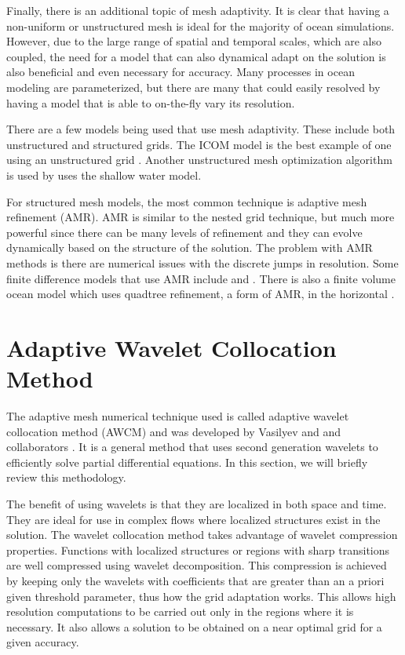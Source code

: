 Finally, there is an additional topic of mesh adaptivity.  It is clear that having a non-uniform or unstructured mesh is ideal for the majority of ocean simulations.  However, due to the large range of spatial and temporal scales, which are also coupled, the need for a model that can also dynamical adapt on the solution is also beneficial and even necessary for accuracy.  Many processes in ocean modeling are parameterized, but there are many that could easily resolved by having a model that is able to on-the-fly vary its resolution.  \cite{08PPGMK}

There are a few models being used that use mesh adaptivity.  These include both unstructured and structured grids.  The ICOM model is the best example of one using an unstructured grid \cite{05PPGPG, 08PGPACMW, 05PPGFGMEPO}.  Another unstructured mesh optimization algorithm is used by \cite{07BCLDR} uses the shallow water model.  

For structured mesh models, the most common technique is adaptive mesh refinement (AMR).  AMR is similar to the nested grid technique, but much more powerful since there can be many levels of refinement and they can evolve dynamically based on the structure of the solution.  The problem with AMR methods is there are numerical issues with the discrete jumps in resolution.  Some finite difference models that use AMR include \cite{99BD} and \cite{05DBB}.  There is also a finite volume ocean model which uses quadtree refinement, a form of AMR, in the horizontal \cite{07PR}.  


\section{Adaptive Wavelet Collocation Method}
\label{sec:wavelet}

The adaptive mesh numerical technique used is called adaptive wavelet collocation method (AWCM) and was developed by Vasilyev and and collaborators \cite{vasilyev:2003,vasilyev-bowman:2000}.  It is a general method that uses second generation wavelets to efficiently solve partial differential equations.  In this section, we will briefly review this methodology. 

The benefit of using wavelets is that they are localized in both space and time.  They are ideal for use in complex flows where localized structures exist in the solution.  The wavelet collocation method takes advantage of wavelet compression properties.  Functions with localized structures or regions with sharp transitions are well compressed using wavelet decomposition.  This compression is achieved by keeping only the wavelets with coefficients that are greater than an a priori given threshold parameter, thus how the grid adaptation works.  This allows high resolution computations to be carried out only in the regions where it is necessary.  It also allows a solution to be obtained on a near optimal grid for a given accuracy.  

